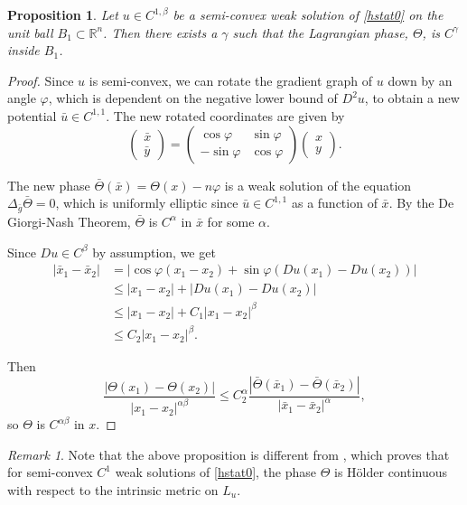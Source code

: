 \documentclass[12pt,reqno]{amsart}%
\theoremstyle{plain}
\newtheorem{proposition}[theorem]{Proposition}
\numberwithin{equation}{section}
\theoremstyle{definition}
\theoremstyle{remark}
\newtheorem{remark}{Remark}[section]
\begin{document}
\begin{proposition}
    Let $u \in C^{1, \beta}$ be a semi-convex weak solution of \eqref{hstat0} on the unit ball $B_1\subset \mathbb{R}^n$. Then there exists a $\gamma$ such that the Lagrangian phase, $\Theta$, is $C^\gamma$ inside $B_1$. 
\end{proposition}

\begin{proof} 
 Since $u$ is semi-convex, we can rotate the gradient graph of $u$ down by an angle $\varphi$, which is dependent on the negative lower bound of $D^2u$, to obtain a new potential $\bar u \in C^{1,1}$. The new rotated coordinates are given by 
$$ \begin{pmatrix} 
\bar x \\ \bar y 
\end{pmatrix} 
= 
\begin{pmatrix} 
\cos \varphi &  \sin \varphi 
\\ -\sin \varphi &\cos \varphi
\end{pmatrix} 
\begin{pmatrix} 
x \\ y
\end{pmatrix}.$$ 

The new phase $\bar \Theta ( \bar x ) = \Theta ( x) - n \varphi $ is a weak solution of the equation $\Delta_{\bar g }\bar \Theta =0$, which is uniformly elliptic since $\bar u \in C^{1,1}$ as a function of $\bar x$. By the De Giorgi-Nash Theorem, $\bar \Theta$ is $C^{\alpha}$ in $\bar x$ for some $\alpha$. 

Since $D u \in C^\beta$ by assumption, we get
\begin{align*}
| \bar x_1 - \bar x_2 | & = | \cos \varphi ( x_1 - x_2 ) + \sin \varphi ( D u ( x_1 ) - D u (x_2 ) ) | \\
& \leq | x_1 - x_2 | + |  D u ( x_1 ) - D u (x_2 )  | \\
& \leq | x_1 - x_2 | + C_1 | x_1 - x_2 | ^ \beta \\
& \leq C_2 | x_1 - x_2 |^\beta .
\end{align*}


Then 
$$ \frac {| \Theta ( x_1 ) - \Theta ( x_2 ) | } {|x_1 - x_2 | ^{\alpha \beta } } \leq 
C_2^\alpha \frac{ | \bar \Theta ( \bar x_1 ) - \bar \Theta ( \bar x_2 ) |}{| \bar x_1 - \bar x_2 |^\alpha }, $$
so $\Theta$ is $C^{\alpha \beta }$ in $x$. 
\end{proof} 

\begin{remark}
Note that the above proposition is different from \cite[Corollary 4.6]{ChenWarren}, which proves that for semi-convex $C^1$ weak solutions of \eqref{hstat0}, the phase $\Theta$ is Hölder continuous with respect to the intrinsic metric on $L_u$. 
\end{remark}
\end{document}
